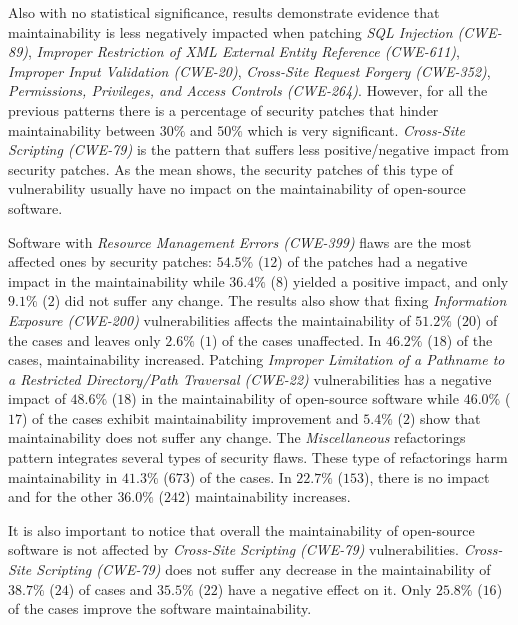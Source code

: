 \documentclass[sigconf,review]{acmart}
\begin{document}
Also with no statistical
significance, results demonstrate evidence that maintainability is less
negatively impacted when patching \emph{SQL Injection (CWE-89)}, \emph{Improper Restriction of XML External Entity Reference (CWE-611)}, \emph{Improper Input Validation (CWE-20)}, \emph{Cross-Site Request Forgery (CWE-352)}, \emph{Permissions, Privileges, and Access Controls (CWE-264)}. However,
for all the previous patterns there is a percentage of security patches that hinder maintainability between $30\%$ and $50\%$ which is very significant. \emph{Cross-Site Scripting (CWE-79)} is the pattern that suffers less positive/negative impact from security patches. As the mean shows, the security
patches of this type of vulnerability usually have no impact on the maintainability of open-source software. 

Software with \emph{Resource Management Errors (CWE-399)} flaws are the most affected ones by security patches: $54.5\%$ ($12$) of the patches had a negative impact
in the maintainability while $36.4\%$ ($8$) yielded a positive impact, and only
$9.1\%$ ($2$) did not suffer any change. The results also show that fixing
\emph{Information Exposure (CWE-200)} vulnerabilities affects the maintainability of $51.2\%$ ($20$) of the cases
and leaves only $2.6\%$ ($1$) of the cases unaffected. In $46.2\%$ ($18$) of the
cases, maintainability increased. 
Patching \emph{Improper Limitation of a Pathname to a Restricted Directory/Path Traversal (CWE-22)} vulnerabilities has a negative
impact of $48.6\%$ ($18$) in the maintainability of open-source software while
$46.0\%$ ($17$) of the cases exhibit maintainability improvement and $5.4\%$
($2$) show that maintainability does not suffer any change. The
\emph{Miscellaneous} refactorings pattern integrates several types of security
flaws. These type of refactorings harm maintainability in $41.3\%$ ($673$) of the
cases. In $22.7\%$ ($153$), there is no impact and for the
other $36.0\%$ ($242$) maintainability increases.

It is also important to notice that overall the maintainability of open-source
software is not affected by \emph{Cross-Site Scripting (CWE-79)} vulnerabilities. \emph{Cross-Site Scripting (CWE-79)}
does not suffer any decrease in the maintainability of $38.7\%$ ($24$) of cases
and $35.5\%$ ($22$) have a negative effect on it. Only $25.8\%$ ($16$) of the
cases improve the software maintainability. 
\end{document}
